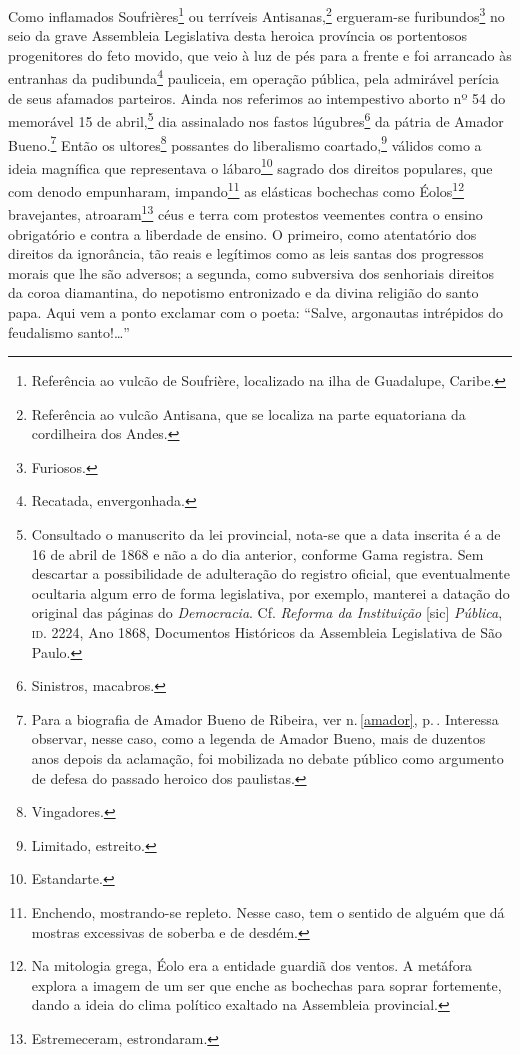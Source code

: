Como inflamados Soufrières\footnote{Referência ao vulcão de Soufrière,
  localizado na ilha de Guadalupe, Caribe.} ou terríveis
Antisanas,\footnote{Referência ao vulcão Antisana, que se localiza na
  parte equatoriana da cordilheira dos Andes.} ergueram-se
furibundos\footnote{Furiosos.} no seio da grave Assembleia Legislativa
desta heroica província os portentosos progenitores do feto movido, que
veio à luz de pés para a frente e foi arrancado às entranhas da
pudibunda\footnote{Recatada, envergonhada.} pauliceia, em operação %
pública, pela admirável perícia de seus afamados parteiros. Ainda nos
referimos ao intempestivo aborto nº 54 do memorável 15 de
abril,\footnote{Consultado o manuscrito da lei provincial, nota-se que
  a data inscrita é a de 16 de abril de 1868 e não a do dia anterior, conforme
  Gama registra. Sem descartar a possibilidade de adulteração do
  registro oficial, que eventualmente ocultaria algum erro de forma
  legislativa, por exemplo, manterei a datação do original das páginas
  do \emph{Democracia}. Cf. \emph{Reforma da Instituição} {[}sic{]}
  \emph{Pública}, \textsc{id}. 2224, Ano 1868, Documentos Históricos da
  Assembleia Legislativa de São Paulo.} dia assinalado nos fastos
lúgubres\footnote{Sinistros, macabros.} da pátria de Amador
Bueno.\footnote{Para a biografia de Amador Bueno de Ribeira, ver n.\,\ref{amador}, p.\,\pageref{amador}. Interessa observar,
  nesse caso, como a legenda de Amador Bueno, mais de duzentos anos
  depois da aclamação, foi mobilizada no debate público como argumento
  de defesa do passado heroico dos paulistas.} Então os
ultores\footnote{Vingadores.} possantes do liberalismo
coartado,\footnote{Limitado, estreito.} válidos como a ideia magnífica
que representava o lábaro\footnote{Estandarte.} sagrado dos direitos
populares, que com denodo empunharam, impando\footnote{Enchendo,
  mostrando-se repleto. Nesse caso, tem o sentido de alguém que dá
  mostras excessivas de soberba e de desdém.} as elásticas bochechas
como Éolos\footnote{Na mitologia grega, Éolo era a entidade guardiã
  dos ventos. A metáfora explora a imagem de um ser que enche as
  bochechas para soprar fortemente, dando a ideia do clima político
  exaltado na Assembleia provincial.} bravejantes, atroaram\footnote{
  Estremeceram, estrondaram.} céus e terra com protestos veementes
contra o ensino obrigatório e contra a liberdade de ensino. O primeiro,
como atentatório dos direitos da ignorância, tão reais e legítimos como
as leis santas dos progressos morais que lhe são adversos; a segunda,
como subversiva dos senhoriais direitos da coroa diamantina, do
nepotismo entronizado e da divina religião do santo papa. Aqui vem a
ponto exclamar com o poeta: ``Salve, argonautas intrépidos do feudalismo
santo!\ldots{}''

